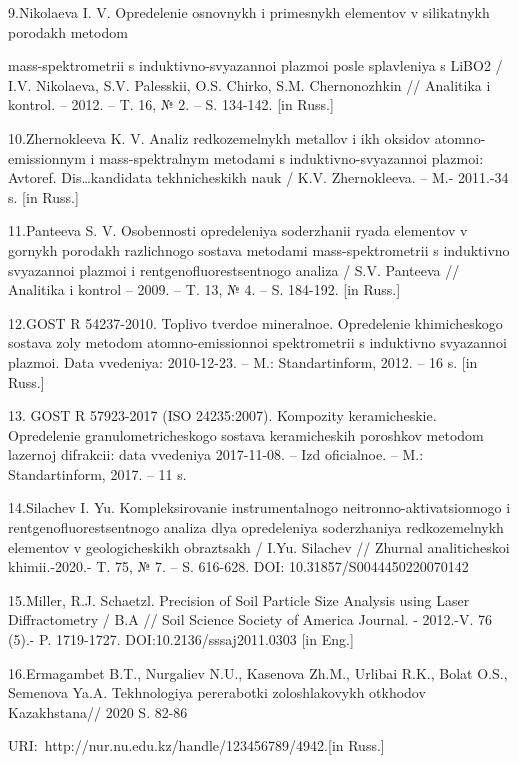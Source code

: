 \begin{noparindent}{2}
9.Nikolaeva I. V. Opredelenie osnovnykh i primesnykh elementov v
silikatnykh porodakh metodom

mass-spektrometrii s induktivno-svyazannoi
plazmoi posle splavleniya s LiBO2 / I.V. Nikolaeva, S.V. Palesskii, O.S.
Chirko, S.M. Chernonozhkin // Analitika i kontrol\textquotesingle. --
2012. -- T. 16, № 2. -- S. 134-142. {[}in Russ.{]}

10.Zhernokleeva K. V. Analiz redkozemel\textquotesingle nykh metallov i
ikh oksidov atomno-emissionnym i mass-spektral\textquotesingle nym
metodami s induktivno-svyazannoi plazmoi: Avtoref. Dis\ldots kandidata
tekhnicheskikh nauk / K.V. Zhernokleeva. -- M.- 2011.-34 s. {[}in
Russ.{]}

11.Panteeva S. V. Osobennosti opredeleniya soderzhanii ryada elementov v
gornykh porodakh razlichnogo sostava metodami mass-spektrometrii s
induktivno svyazannoi plazmoi i rentgenofluorestsentnogo analiza / S.V.
Panteeva // Analitika i kontrol\textquotesingle{} -- 2009. -- T. 13, №
4. -- S. 184-192. {[}in Russ.{]}

12.GOST R 54237-2010. Toplivo tverdoe mineral\textquotesingle noe.
Opredelenie khimicheskogo sostava zoly metodom atomno-emissionnoi
spektrometrii s induktivno svyazannoi plazmoi. Data vvedeniya:
2010-12-23. -- M.: Standartinform, 2012. -- 16 s. {[}in Russ.{]}

13. GOST R 57923-2017 (ISO 24235:2007). Kompozity keramicheskie.
Opredelenie granulometricheskogo sostava keramicheskih poroshkov metodom
lazernoj difrakcii: data vvedeniya 2017-11-08. -- Izd
oficial\textquotesingle noe. -- M.: Standartinform, 2017. -- 11 s.

14.Silachev I. Yu. Kompleksirovanie instrumental\textquotesingle nogo
neitronno-aktivatsionnogo i rentgenofluorestsentnogo analiza dlya
opredeleniya soderzhaniya redkozemel\textquotesingle nykh elementov v
geologicheskikh obraztsakh / I.Yu. Silachev // Zhurnal analiticheskoi
khimii.-2020.- T. 75, № 7. -- S. 616-628. DOI:
10.31857/S0044450220070142

15.Miller, R.J. Schaetzl. Precision of Soil Particle Size Analysis using
Laser Diffractometry / B.A // Soil Science Society of America Journal. -
2012.-V. 76 (5).- P. 1719-1727. DOI:10.2136/sssaj2011.0303 {[}in Eng.{]}

16.Ermagambet B.T., Nurgaliev N.U., Kasenova Zh.M., Urlibai R.K., Bolat
O.S., Semenova Ya.A. Tekhnologiya pererabotki zoloshlakovykh otkhodov
Kazakhstana// 2020 S. 82-86

URI:~http://nur.nu.edu.kz/handle/123456789/4942.{[}in Russ.{]}


\end{noparindent}
